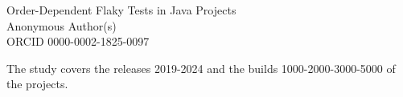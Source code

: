 

\begin{center}
{\Large Order-Dependent Flaky Tests in Java Projects}\\[1ex]
Anonymous Author(s)\\
ORCID 0000-0002-1825-0097
\end{center}

\visibleintro
The study covers the releases 2019-2024 and the builds 1000-2000-3000-5000 of the projects.

